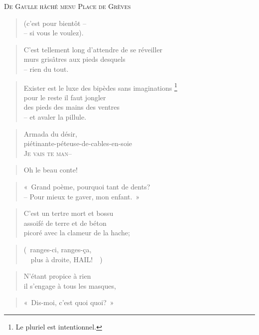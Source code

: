   \begin{center}
    \textsc{De Gaulle hâché menu Place de Grèves}
  \end{center}
  \begin{verse}
    (c’est pour bientôt --\\
    -- si vous le voulez).
  \end{verse}
  \begin{verse}
    C’est tellement long d’attendre de se réveiller\\
    murs grisâtres aux pieds desquels\\
    -- rien du tout.
  \end{verse}
  \begin{verse}
    Exister est le luxe des bipèdes sans imaginations
    \footnote{Le pluriel est intentionnel.}\\
    pour le reste il faut jongler\\
    des pieds des mains des ventres\\
    -- et avaler la pillule.
  \end{verse}
  \begin{verse}
    Armada du désir,\\
    piétinante-péteuse-de-cables-en-soie\\
    \textsc{Je vais te man--}
  \end{verse}
  \begin{verse}
    Oh le beau conte!
  \end{verse}
  \begin{verse}
    «~Grand poème, pourquoi tant de dents?\\
    -- Pour mieux te gaver, mon enfant.~»
  \end{verse}
  \begin{verse}
    C’est un tertre mort et bossu\\
    assoifé de terre et de béton\\
    picoré avec la clameur de la hache;
  \end{verse}
  \begin{verse}
    (~ranges-ci, ranges-ça,\\
    ~~plus à droite, HAIL!~~)
  \end{verse}
  \begin{verse}
    N’étant propice à rien\\
    il s’engage à tous les masques,
  \end{verse}
  \begin{verse}
    «~Dis-moi, c’est quoi quoi?~»
  \end{verse}

